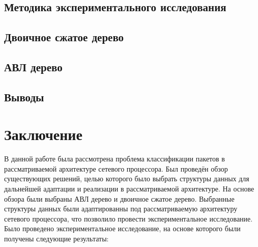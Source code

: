 \documentclass[a4paper, 12pt, titlepage, finall]{extreport}
\begin{document}
        \section{Методика экспериментального исследования}
        \section{Двоичное сжатое дерево}
        \section{АВЛ дерево}
        \section{Выводы}
    \chapter{Заключение}
        В данной работе была рассмотрена проблема классификации пакетов в рассматриваемой архитектуре сетевого процессора. Был проведён обзор существующих решений,
        целью которого было выбрать структуры данных для дальнейшей адаптации и реализации в рассматриваемой архитектуре. На основе обзора были выбраны АВЛ дерево и 
        двоичное сжатое дерево. Выбранные структуры данных были адаптированны под рассматриваемую архитектуру сетевого процессора, что позволило провести экспериментальное исследование.
        Было проведено экспериментальное исследование, на основе которого были получены следующие результаты:
\printbibliography{}
%
\end{document}
